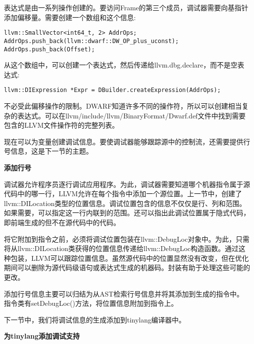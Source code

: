 表达式是由一系列操作创建的。要访问Frame的第三个成员，调试器需要向基指针添加偏移量。需要创建一个数组和这个信息:

\begin{lstlisting}[caption={}]
llvm::SmallVector<int64_t, 2> AddrOps;
AddrOps.push_back(llvm::dwarf::DW_OP_plus_uconst);
AddrOps.push_back(Offset);
\end{lstlisting}

从这个数组中，可以创建一个表达式，然后传递给llvm.dbg.declare，而不是空表达式:\par

\begin{lstlisting}[caption={}]
llvm::DIExpression *Expr = DBuilder.createExpression(AddrOps);
\end{lstlisting}

不必受此偏移操作的限制。DWARF知道许多不同的操作符，所以可以创建相当复杂的表达式。可以在llvm/include/llvm/BinaryFormat/Dwarf.def文件中找到需要包含的LLVM文件操作符的完整列表。\par

现在可以为变量创建调试信息。要使调试器能够跟踪源中的控制流，还需要提供行号信息，这是下一节的主题。\par


\hspace*{\fill} \par %
\textbf{添加行号}

调试器允许程序员逐行调试应用程序。为此，调试器需要知道哪个机器指令属于源代码中的哪一行，LLVM允许在每个指令中添加一个源位置。上一节中，创建了llvm::DILocation类型的位置信息。调试位置包含的信息不仅仅是行、列和范围。如果需要，可以指定这一行内联到的范围。还可以指出此调试位置属于隐式代码，即前端生成的但不在源代码中的代码。\par

将它附加到指令之前，必须将调试位置包装在llvm::DebugLoc对象中。为此，只需将从llvm::DILocation类获得的位置信息传递给llvm::DebugLoc构造函数。通过这种包装，LLVM可以跟踪位置信息。虽然源代码中的位置显然没有改变，但在优化期间可以删除为源代码级语句或表达式生成的机器码。封装有助于处理这些可能的更改。\par

添加行号信息主要可以归结为从AST检索行号信息并将其添加到生成的指令中。指令类有setDebugLoc()方法，将位置信息附加到指令上。\par

下一节中，我们将调试信息的生成添加到tinylang编译器中。\par

\hspace*{\fill} \par %
\textbf{为tinylang添加调试支持}

